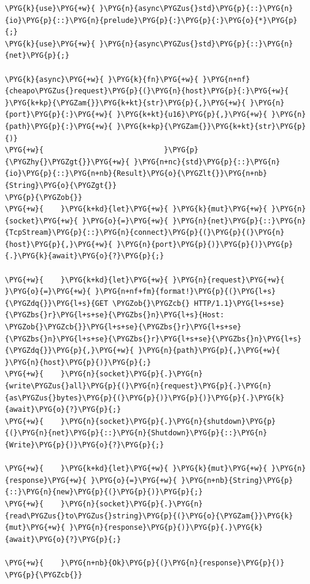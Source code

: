 \begin{Verbatim}[commandchars=\\\{\},breaklines=true,breakanywhere=true,fontsize=\codefont,xleftmargin=17bp]
\PYG{k}{use}\PYG{+w}{ }\PYG{n}{async\PYGZus{}std}\PYG{p}{::}\PYG{n}{io}\PYG{p}{::}\PYG{n}{prelude}\PYG{p}{:}\PYG{p}{:}\PYG{o}{*}\PYG{p}{;}
\PYG{k}{use}\PYG{+w}{ }\PYG{n}{async\PYGZus{}std}\PYG{p}{::}\PYG{n}{net}\PYG{p}{;}

\PYG{k}{async}\PYG{+w}{ }\PYG{k}{fn}\PYG{+w}{ }\PYG{n+nf}{cheapo\PYGZus{}request}\PYG{p}{(}\PYG{n}{host}\PYG{p}{:}\PYG{+w}{ }\PYG{k+kp}{\PYGZam{}}\PYG{k+kt}{str}\PYG{p}{,}\PYG{+w}{ }\PYG{n}{port}\PYG{p}{:}\PYG{+w}{ }\PYG{k+kt}{u16}\PYG{p}{,}\PYG{+w}{ }\PYG{n}{path}\PYG{p}{:}\PYG{+w}{ }\PYG{k+kp}{\PYGZam{}}\PYG{k+kt}{str}\PYG{p}{)}
\PYG{+w}{                            }\PYG{p}{\PYGZhy{}\PYGZgt{}}\PYG{+w}{ }\PYG{n+nc}{std}\PYG{p}{::}\PYG{n}{io}\PYG{p}{::}\PYG{n+nb}{Result}\PYG{o}{\PYGZlt{}}\PYG{n+nb}{String}\PYG{o}{\PYGZgt{}}
\PYG{p}{\PYGZob{}}
\PYG{+w}{    }\PYG{k+kd}{let}\PYG{+w}{ }\PYG{k}{mut}\PYG{+w}{ }\PYG{n}{socket}\PYG{+w}{ }\PYG{o}{=}\PYG{+w}{ }\PYG{n}{net}\PYG{p}{::}\PYG{n}{TcpStream}\PYG{p}{::}\PYG{n}{connect}\PYG{p}{(}\PYG{p}{(}\PYG{n}{host}\PYG{p}{,}\PYG{+w}{ }\PYG{n}{port}\PYG{p}{)}\PYG{p}{)}\PYG{p}{.}\PYG{k}{await}\PYG{o}{?}\PYG{p}{;}

\PYG{+w}{    }\PYG{k+kd}{let}\PYG{+w}{ }\PYG{n}{request}\PYG{+w}{ }\PYG{o}{=}\PYG{+w}{ }\PYG{n+nf+fm}{format!}\PYG{p}{(}\PYG{l+s}{\PYGZdq{}}\PYG{l+s}{GET \PYGZob{}\PYGZcb{} HTTP/1.1}\PYG{l+s+se}{\PYGZbs{}r}\PYG{l+s+se}{\PYGZbs{}n}\PYG{l+s}{Host: \PYGZob{}\PYGZcb{}}\PYG{l+s+se}{\PYGZbs{}r}\PYG{l+s+se}{\PYGZbs{}n}\PYG{l+s+se}{\PYGZbs{}r}\PYG{l+s+se}{\PYGZbs{}n}\PYG{l+s}{\PYGZdq{}}\PYG{p}{,}\PYG{+w}{ }\PYG{n}{path}\PYG{p}{,}\PYG{+w}{ }\PYG{n}{host}\PYG{p}{)}\PYG{p}{;}
\PYG{+w}{    }\PYG{n}{socket}\PYG{p}{.}\PYG{n}{write\PYGZus{}all}\PYG{p}{(}\PYG{n}{request}\PYG{p}{.}\PYG{n}{as\PYGZus{}bytes}\PYG{p}{(}\PYG{p}{)}\PYG{p}{)}\PYG{p}{.}\PYG{k}{await}\PYG{o}{?}\PYG{p}{;}
\PYG{+w}{    }\PYG{n}{socket}\PYG{p}{.}\PYG{n}{shutdown}\PYG{p}{(}\PYG{n}{net}\PYG{p}{::}\PYG{n}{Shutdown}\PYG{p}{::}\PYG{n}{Write}\PYG{p}{)}\PYG{o}{?}\PYG{p}{;}

\PYG{+w}{    }\PYG{k+kd}{let}\PYG{+w}{ }\PYG{k}{mut}\PYG{+w}{ }\PYG{n}{response}\PYG{+w}{ }\PYG{o}{=}\PYG{+w}{ }\PYG{n+nb}{String}\PYG{p}{::}\PYG{n}{new}\PYG{p}{(}\PYG{p}{)}\PYG{p}{;}
\PYG{+w}{    }\PYG{n}{socket}\PYG{p}{.}\PYG{n}{read\PYGZus{}to\PYGZus{}string}\PYG{p}{(}\PYG{o}{\PYGZam{}}\PYG{k}{mut}\PYG{+w}{ }\PYG{n}{response}\PYG{p}{)}\PYG{p}{.}\PYG{k}{await}\PYG{o}{?}\PYG{p}{;}

\PYG{+w}{    }\PYG{n+nb}{Ok}\PYG{p}{(}\PYG{n}{response}\PYG{p}{)}
\PYG{p}{\PYGZcb{}}
\end{Verbatim}


